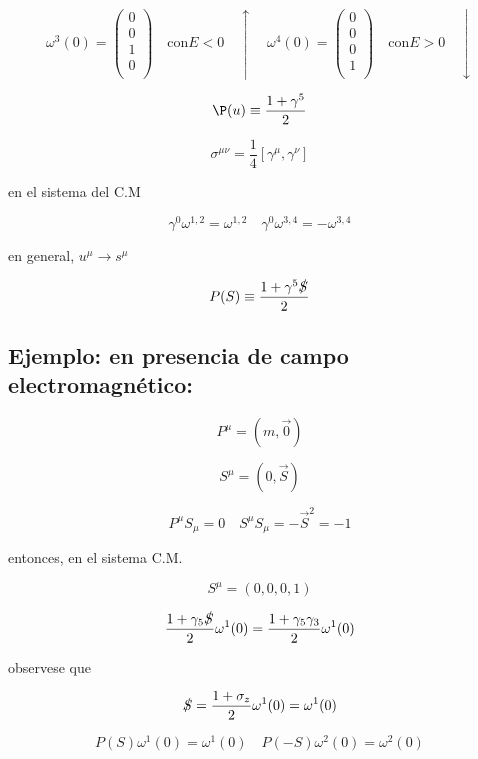 \documentclass{report}
\begin{document}
\[\omega^{3}(0) = \left ( \begin{array}{cccc}
 0   \\
 0   \\
 1   \\
 0   \\
 \end{array} \right) \quad \text{con} E<0 \quad \uparrow 
 \quad \omega^{4}(0) = \left ( \begin{array}{cccc}
 0   \\
 0   \\
 0   \\
 1   \\
 \end{array} \right) \quad \text{con} E>0 \quad \downarrow \]
 
\begin{equation}
\P(u) \equiv \frac{1 + \gamma^5 }{2}
\end{equation}

\[\sigma^{\mu \nu} = \frac{1}{4}[\gamma^{\mu},\gamma^{\nu}]\]

en el sistema del C.M

\[\gamma^{0} \omega^{1,2} = \omega^{1,2} \quad \gamma^0 \omega^{3,4} = - \omega^{3,4}\]

en general, $u^{\mu} \rightarrow s^{\mu}$

\begin{equation}
P(S) \equiv \frac{1+\gamma^5 \slashed{S}}{2}
\end{equation}

\subsection{Ejemplo: en presencia de campo electromagnético:}

\[P^{\mu} = (m, \overrightarrow{0})\]

\[S^{\mu} = (0,\overrightarrow{S})\]

\[P^{\mu} S_{\mu} = 0 \quad S^{\mu}S_{\mu} = -\overrightarrow{S}^{2} = -1\]

entonces, en el sistema C.M.

\[S^{\mu} = (0,0,0,1)\]

\[\frac{1+\gamma_5 \slashed{S}}{2 } \omega^{1}(0) = \frac{1+\gamma_5 \gamma_3 }{2 } \omega^1 (0)\]

observese que

\[\slashed{S} = \frac{1+\sigma_z }{2 } \omega^1 (0) = \omega^1 (0)\]

\[P(S)\omega^{1}(0)= \omega^1 (0) \quad P(-S) \omega^2 (0) = \omega^2 (0)\]
\end{document}
